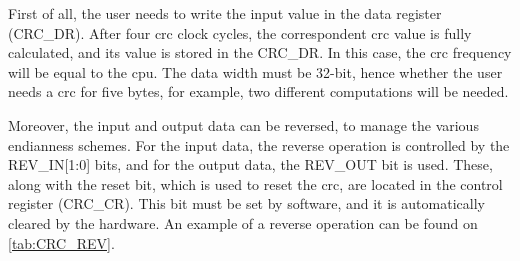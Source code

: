 First of all, the user needs to write the input value 
in the data register (CRC\_DR). After four \gls{crc} clock cycles, the correspondent \gls{crc} value is fully calculated, and its
value is stored in the CRC\_DR. In this case, the \gls{crc} frequency will be equal to the \gls{cpu}. The data width must be 32-bit, 
hence whether the user needs a \gls{crc} for five bytes, for example, two different computations will be needed. 

Moreover, the input and output data can be reversed, to manage the various endianness schemes. For the input data, the reverse operation 
is controlled by the REV\_IN[1:0] bits, and for the output data, the REV\_OUT bit is used. These, along with the reset bit, which is used to 
reset the \gls{crc}, are located in the control register (CRC\_CR). This bit must be set by software, and it is automatically cleared by
the hardware. An example of a reverse operation can be found on \autoref{tab:CRC_REV}.

